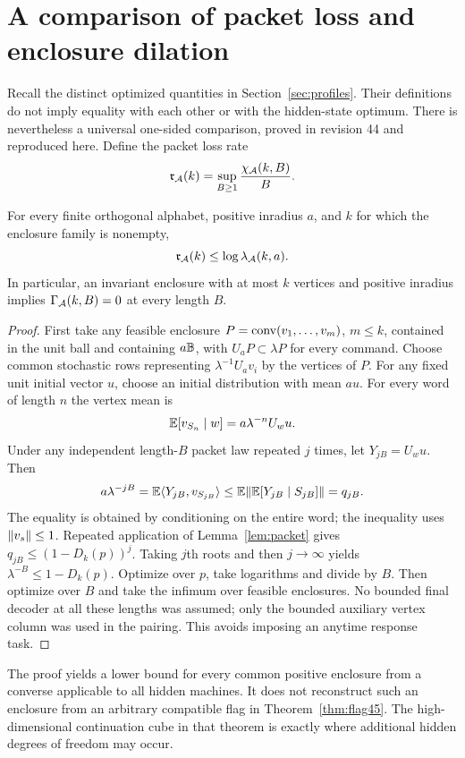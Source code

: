 \section{A comparison of packet loss and enclosure dilation}\label{sec:profile-comparison45}
Recall the distinct optimized quantities in Section~\ref{sec:profiles}. Their definitions do not imply equality with each other or with the hidden-state optimum. There is nevertheless a universal one-sided comparison, proved in revision 44 \cite{GTF44} and reproduced here. Define the packet loss rate
\[
 \mathfrak r_{\mathcal A}(k)=\sup_{B\ge1}\frac{\chi_{\mathcal A}(k,B)}{B}.
\]

\begin{theorem}\label{thm:comparison45}
For every finite orthogonal alphabet, positive inradius $a$, and $k$ for which the enclosure family is nonempty,
\begin{equation}\label{eq:profile-comparison45}
 \mathfrak r_{\mathcal A}(k)\le\log\lambda_{\mathcal A}(k,a).
\end{equation}
In particular, an invariant enclosure with at most $k$ vertices and positive inradius implies $\Gamma_{\mathcal A}(k,B)=0$ at every length $B$.
\end{theorem}
\begin{proof}
First take any feasible enclosure $P=\operatorname{conv}(v_1,\ldots,v_m)$, $m\le k$, contained in the unit ball and containing $a\mathbb B$, with $U_aP\subset\lambda P$ for every command. Choose common stochastic rows representing $\lambda^{-1}U_av_i$ by the vertices of $P$. For any fixed unit initial vector $u$, choose an initial distribution with mean $au$. For every word of length $n$ the vertex mean is
\[
 \mathbb E[v_{S_n}\mid w]=a\lambda^{-n}U_wu.
\]
Under any independent length-$B$ packet law repeated $j$ times, let $Y_{jB}=U_wu$. Then
\[
 a\lambda^{-jB}
   =\mathbb E\langle Y_{jB},v_{S_{jB}}\rangle
   \le\mathbb E\lVert\mathbb E[Y_{jB}\mid S_{jB}]\rVert=q_{jB}.
\]
The equality is obtained by conditioning on the entire word; the inequality uses $\lVert v_s\rVert\le1$. Repeated application of Lemma~\ref{lem:packet} gives
$q_{jB}\le(1-D_k(p))^j$. Taking $j$th roots and then $j\to\infty$ yields $\lambda^{-B}\le1-D_k(p)$. Optimize over $p$, take logarithms and divide by $B$. Then optimize over $B$ and take the infimum over feasible enclosures. No bounded final decoder at all these lengths was assumed; only the bounded auxiliary vertex column was used in the pairing. This avoids imposing an anytime response task.
\end{proof}

The proof yields a lower bound for every common positive enclosure from a converse applicable to all hidden machines. It does not reconstruct such an enclosure from an arbitrary compatible flag in Theorem~\ref{thm:flag45}. The high-dimensional continuation cube in that theorem is exactly where additional hidden degrees of freedom may occur.

